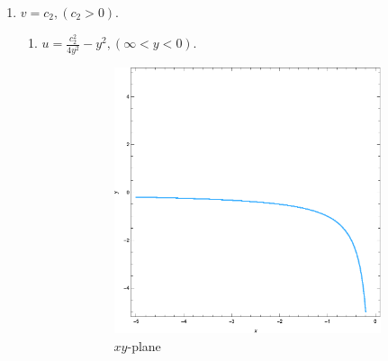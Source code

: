 \documentclass[12pt]{book}
\begin{document}
\begin{enumerate}
    \item $v = c_2, (c_2 > 0).$
    \begin{enumerate}[label = {(\roman*)}]
        \item 
            $u = \frac{c_{2}^{2}}{4y^2} - y^2, (\infty < y < 0).$
            \begin{figure}[H]
                \centering
                \begin{subfigure}{0.45\textwidth}
                    \centering
                    \includegraphics[width = \textwidth]{./figs/chapter_1/f_map_1_3.eps}
                    \caption{$xy$-plane}
                \end{subfigure}
                \qquad
                \begin{subfigure}{0.45\textwidth}
                    \centering

\end{subfigure}
\end{figure}
\end{enumerate}
\end{enumerate}
\end{document}
